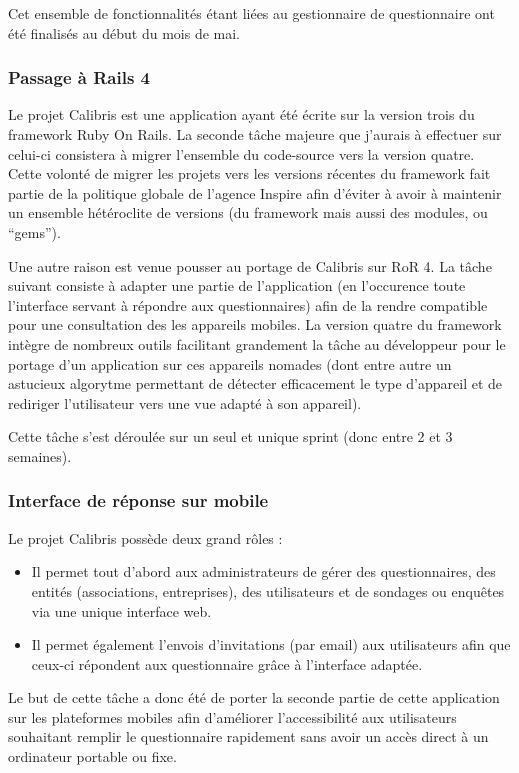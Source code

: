 \documentclass[12pt,a4paper]{book}
\begin{document}
Cet ensemble de fonctionnalités étant liées au gestionnaire de questionnaire ont été finalisés au début du mois de mai.

\subsubsection{Passage à Rails 4}

Le projet Calibris est une application ayant été écrite sur la version trois du framework Ruby On Rails. La seconde tâche majeure que j'aurais à effectuer sur celui-ci consistera à migrer l'ensemble du code-source vers la version quatre. Cette volonté de migrer les projets vers les versions récentes du framework fait partie de la politique globale de l'agence Inspire afin d'éviter à avoir à maintenir un ensemble hétéroclite de versions (du framework mais aussi des modules, ou ``gems'').

Une autre raison est venue pousser au portage de Calibris sur RoR 4. La tâche suivant consiste à adapter une partie de l'application (en l'occurence toute l'interface servant à répondre aux questionnaires) afin de la rendre compatible pour une consultation des les appareils mobiles. La version quatre du framework intègre de nombreux outils facilitant grandement la tâche au développeur pour le portage d'un application sur ces appareils nomades (dont entre autre un astucieux algorytme permettant de détecter efficacement le type d'appareil et de rediriger l'utilisateur vers une vue adapté à son appareil).

Cette tâche s'est déroulée sur un seul et unique sprint (donc entre 2 et 3 semaines).

\subsubsection{Interface de réponse sur mobile}

Le projet Calibris possède deux grand rôles :
\begin{itemize}
  \item Il permet tout d'abord aux administrateurs de gérer des questionnaires, des entités (associations, entreprises), des utilisateurs et de sondages ou enquêtes via une unique interface web.
  \item Il permet également l'envois d'invitations (par email) aux utilisateurs afin que ceux-ci répondent aux questionnaire grâce à l'interface adaptée.  
\end{itemize}

Le but de cette tâche a donc été de porter la seconde partie de cette application sur les plateformes mobiles afin d'améliorer l'accessibilité aux utilisateurs souhaitant remplir le questionnaire rapidement sans avoir un accès direct à un ordinateur portable ou fixe.
\end{document}
